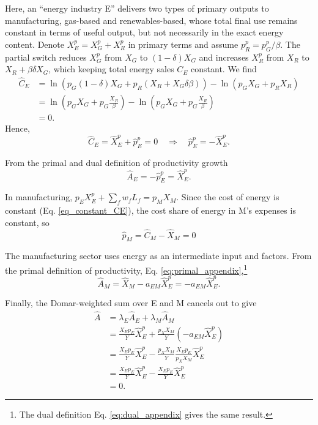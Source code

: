 \documentclass[11pt]{article}
\begin{document}
Here, an ``energy industry E'' delivers two types of primary outputs to manufacturing, gas-based and renewables-based, whose total final use remains constant in terms of useful output, but not necessarily in the exact energy content. Denote $X_E^p=X_G^p + X_R^p$ in primary terms and assume $p_R^p = p_G^p/\beta$. The partial switch reduces $X_G^p$ from $X_G$ to $(1-\delta)X_G$ and increases $X_R^p$ from $X_R$ to $X_R + \beta\delta X_G$, which keeping total energy sales $C_E$ constant. 
We find
\begin{equation}
\label{eq_constant_CE}
    \begin{aligned}
    \hat{C}_E&=\ln(p_G(1-\delta)X_G+p_R(X_R+X_G\delta \beta ))-\ln(p_GX_G+p_RX_R)\\
    &=\ln(p_GX_G+p_G\frac{X_R}{\beta })-\ln(p_GX_G+p_G\frac{X_R}{\beta })\\
&=0.
\end{aligned}
\end{equation}
Hence,
\begin{equation}
\label{eq_pe_xe}
     \hat{C}_E
= \hat{X}_E^p + \hat{p}_E^p
= 0
\quad\Longrightarrow\quad
    \hat{p}_E^p
= - \hat{X}_E^p.
\end{equation}

From the primal and dual definition of productivity growth
\begin{equation}
    \hat{A}_E = - \hat{p}_E^p =\hat{X}_E^p.
\end{equation}


In manufacturing, $p_EX_E^p + \sum_f w_fL_f = p_M X_M$. Since the cost of energy is constant (Eq. \ref{eq_constant_CE}), the cost share of energy in M's expenses is constant, so
\begin{equation*}
        \hat{p}_M=\hat{C}_M-\hat{X}_M
= 0
\end{equation*}

The manufacturing sector uses energy as an intermediate input and factors. 
From the primal definition of productivity, Eq. \ref{eq:primal_appendix},\footnote{The dual definition Eq. \ref{eq:dual_appendix} gives the same result.}
\begin{equation*}
   \hat{A}_M= \hat{X}_M-a_{EM}\hat{X}_E^p= -a_{EM}\hat{X}_E^p.
\end{equation*}

Finally, the Domar-weighted sum over E and M cancels out to give
\begin{equation}
    \begin{aligned}
    \hat{A}&=\lambda_E \hat{A}_E+\lambda_M \hat{A}_M\\
    &=\frac{X_Ep_E}{Y} \hat{X}_E^p+ \frac{p_XX_M}{Y} (-a_{EM}\hat{X}_E^p)\\
    &=\frac{X_Ep_E}{Y} \hat{X}_E^p - \frac{p_XX_M}{Y} \frac{X_Ep_E}{p_XX_M}\hat{X}_E^p\\
     &=\frac{X_Ep_E}{Y} \hat{X}_E^p - \frac{X_Ep_E}{Y}\hat{X}_E^p\\
     &=0.
\end{aligned}
\end{equation}
\end{document}
